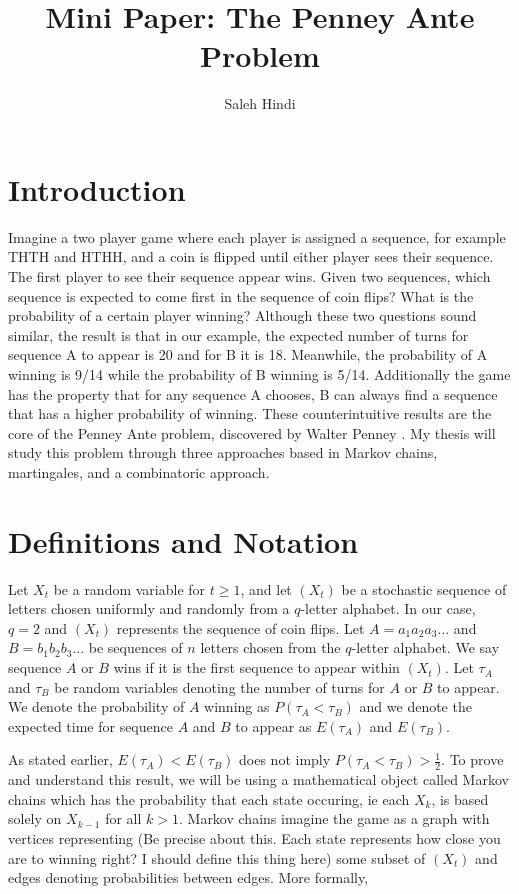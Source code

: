 \documentclass{article}
\numberwithin{mytheorem}{subsection} %
\begin{document}
	\title{Mini Paper: The Penney Ante Problem}
	\author{Saleh Hindi}

	\maketitle

	\section{Introduction}
		Imagine a two player game where
		each player is assigned a sequence, for example THTH and HTHH, and a coin is flipped until either player sees their sequence.
		The first player to see their sequence appear wins.
		Given two sequences, which sequence is expected to come first in the
		sequence of coin flips? What is the probability of a certain player winning? Although these two
		questions sound similar, the result is that in our example,
		the expected number of turns for sequence A to appear is 20 and for B it is 18. Meanwhile, the probability
		of A winning is 9/14 while the probability of B winning is 5/14. Additionally the game has the property
		that for any sequence A chooses, B can always find a sequence that has a higher probability of winning.
		These counterintuitive results are the core of the Penney Ante problem, discovered by Walter Penney
		\cite{gardner}. My thesis will study this problem through three approaches based in Markov chains, martingales,
		and a combinatoric approach.

	\section{Definitions and Notation}
		Let $X_t$ be a random variable for $t \geq 1$, and let $(X_t)$ be a stochastic sequence of letters chosen uniformly and
		randomly from a $q$-letter alphabet. In our case, $q=2$ and $(X_t)$ represents the sequence of coin flips. Let $A=a_1a_2a_3...$ and $B=b_1b_2b_3...$ be sequences
		of $n$ letters chosen from the $q$-letter alphabet. We say
		sequence $A$ or $B$ wins if it is the first sequence to appear within $(X_t)$. Let $\tau_A$ and $\tau_B$ be random variables denoting
		the number of turns for $A$ or $B$ to appear. We denote
		the probability of $A$ winning as $P(\tau_A < \tau_B)$ and we denote the expected time for sequence
		$A$ and $B$ to appear as $E(\tau_A)$ and $E(\tau_B)$.

		As stated earlier, $E(\tau_A) < E(\tau_B)$ does not imply $P(\tau_A < \tau_B) > \frac{1}{2}$. To prove and understand this result, we will be using 
		a mathematical object called Markov chains which has the probability that each state occuring, ie each $X_k$, is based solely on $X_{k-1}$ for all $k > 1$. Markov chains imagine the game as a graph with vertices representing (Be precise about this. Each state represents how close you are to winning right? I should define this thing here) some subset of $(X_t)$ and edges denoting probabilities between edges. More formally,
\end{document}
